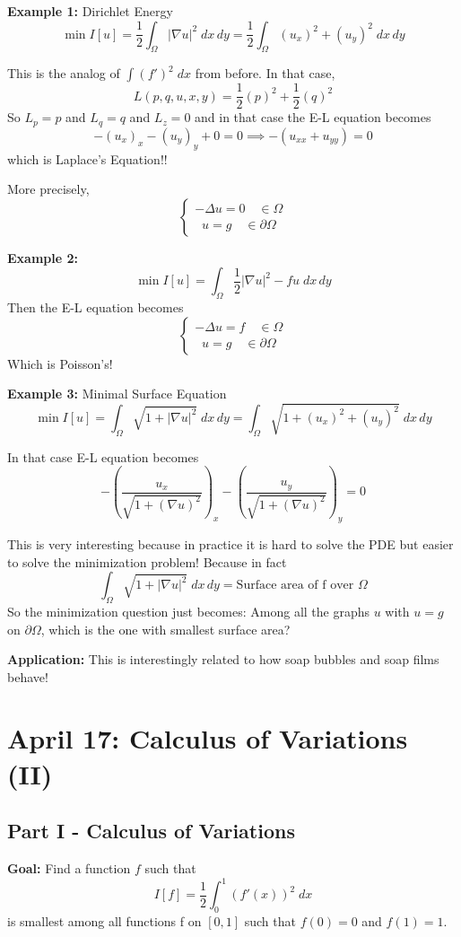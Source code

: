 \documentclass[12pt]{article}
\begin{document}
\textbf{Example 1:} Dirichlet Energy 
\[\min I[u] = \frac{1}{2} \int_{\Omega} |\nabla u|^2 \; dx\, dy = \frac{1}{2}\int_{\Omega} (u_x)^2 + (u_y)^2 \; dx\, dy\]

This is the analog of $\int (f')^2\; dx$ from before. In that case, 
\[L(p, q, u, x, y) = \frac{1}{2}(p)^2 + \frac{1}{2}(q)^2\]
So $L_p =p$ and $L_q = q$ and $L_z = 0$ and in that case the E-L equation becomes 
\[-(u_x)_x - (u_y)_y + 0 = 0 \implies -(u_{xx} + u_{yy}) = 0\]
which is Laplace's Equation!!

More precisely, 
\[\begin{cases}
    -\Delta u = 0 \quad \in \Omega\\
    \;\; u = g \quad \in \partial \Omega
\end{cases}\]

\textbf{Example 2:}
\[\min I[u] = \int_{\Omega} \frac{1}{2}|\nabla u|^2 - fu\; dx\, dy\]
Then the E-L equation becomes 
\[\begin{cases}
    -\Delta u = f \quad \in \Omega\\
    \;\; u = g \quad \in \partial \Omega
\end{cases}\]
Which is Poisson's!

\textbf{Example 3:} Minimal Surface Equation 
\[\min I[u] = \int_{\Omega} \sqrt{1 + |\nabla u|^2}\; dx\, dy = \int_{\Omega} \sqrt{1 + (u_x)^2 + (u_y)^2}\; dx\, dy\]

In that case E-L equation becomes 
\[-\left(\frac{u_x}{\sqrt{1 + (\nabla u)^2}}\right)_x - \left(\frac{u_y}{\sqrt{1 + (\nabla u)^2}}\right)_y = 0\]

This is very interesting because in practice it is hard to solve the PDE but easier to solve the minimization problem!
Because in fact 
\[\int_{\Omega} \sqrt{1 + |\nabla u|^2}\; dx\, dy = \text{Surface area of f over $\Omega$}\]
So the minimization question just becomes: Among all the graphs $u$ with $u = g$ on $\partial \Omega$, which is the one with smallest surface area?

\textbf{Application:} This is interestingly related to how soap bubbles and soap films behave!

\section{April 17: Calculus of Variations (II)}
\subsection*{Part I - Calculus of Variations}
\textbf{Goal:} Find a function $f$ such that 
\[I[f] = \frac{1}{2}\int_0^1 (f'(x))^2 \; dx\]
is smallest among all functions f on $[0, 1]$ such that $f(0)=0$ and $f(1)=1$. 
\end{document}
